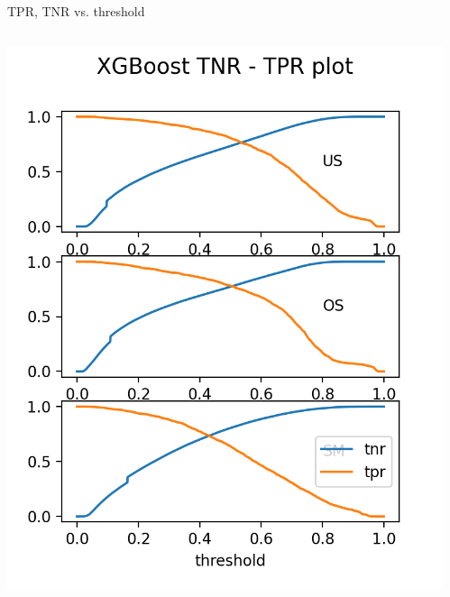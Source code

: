 \documentclass{beamer}
\begin{document}
\begin{frame}{TPR, TNR vs. threshold}
\begin{columns} 
\fontsize{9pt}{7.2}\selectfont

    \begin{column}{.5\textwidth}
    \begin{center}
        \includegraphics[scale=0.55]{img/xgb_tnr_tpr.png}
		\end{center}
    \end{column}
    \begin{column}{.5\textwidth}
        \begin{center}

\end{center}
\end{column}
\end{columns}
\end{frame}
\end{document}
